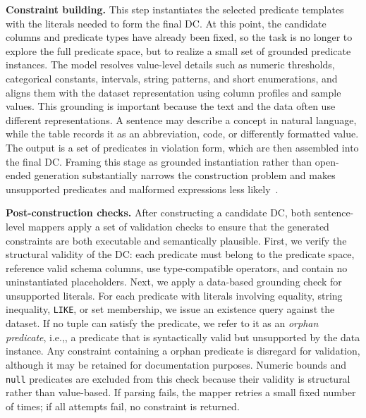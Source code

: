 \smallskip\noindent\textbf{Constraint building.}
This step instantiates the selected predicate templates with the literals needed to form the final DC. At this point, the candidate columns and predicate types have already been fixed, so the task is no longer to explore the full predicate space, but to realize a small set of grounded predicate instances. The model resolves value-level details such as numeric thresholds, categorical constants, intervals, string patterns, and short enumerations, and aligns them with the dataset representation using column profiles and sample values. This grounding is important because the text and the data often use different representations. A sentence may describe a concept in natural language, while the table records it as an abbreviation, code, or differently formatted value. The output is a set of predicates in violation form, which are then assembled into the final DC. Framing this stage as grounded instantiation rather than open-ended generation substantially narrows the construction problem and makes unsupported predicates and malformed expressions less likely~\cite{pourreza2023din,picard2021,lin-etal-2020-bridging}.


\smallskip\noindent\textbf{Post-construction checks.}
After constructing a candidate DC, both sentence-level mappers apply a set of validation checks to ensure that the generated constraints are both executable and semantically plausible. First, we verify the structural validity of the DC: each predicate must belong to the predicate space, reference valid schema columns, use type-compatible operators, and contain no uninstantiated placeholders. Next, we apply a data-based grounding check for unsupported literals. For each predicate with literals involving equality, string inequality, \texttt{LIKE}, or set membership, we issue an existence query against the dataset. If no tuple can satisfy the predicate, we refer to it as an \emph{orphan predicate}, i.e.,, a predicate that is syntactically valid but unsupported by the data instance. Any constraint containing a orphan predicate is disregard for validation, although it may be retained for documentation purposes. 
Numeric bounds and \texttt{null} predicates are excluded from this check because their validity is structural rather than value-based.
If parsing fails, the mapper retries a small fixed number of times; if all attempts fail, no constraint is returned.



